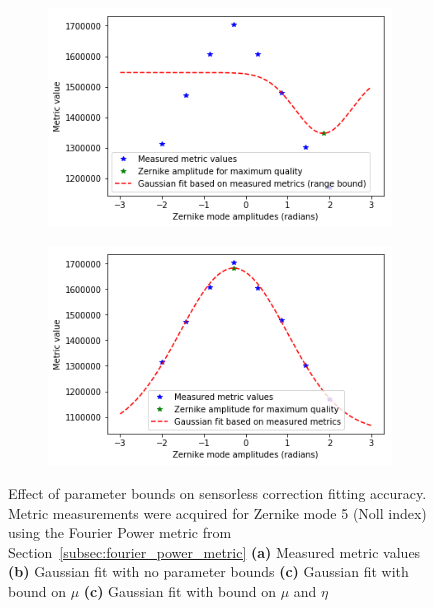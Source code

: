 \begin{figure}[h]
	\begin{subfigure}{0.48\textwidth}
		\centering
		\includegraphics[width=\linewidth]{images/zernike_fitting_current_power_metric_range_bound_2.png}
		\caption{}
		\label{fig:zernike_fitting_current_power_metric_range_bound_2}
	\end{subfigure}
	\begin{subfigure}{0.48\textwidth}
		\centering
		\includegraphics[width=\linewidth]{images/zernike_fitting_current_power_metric_bound_2.png}
		\caption{}
		\label{fig:zernike_fitting_current_power_metric_bound_2}
	\end{subfigure}
	\caption[Effect of parameter bounds on sensorless correction fitting accuracy]{Effect of parameter bounds on sensorless correction fitting accuracy. Metric measurements were acquired for Zernike mode 5 (Noll index) using the Fourier Power metric from Section~\ref{subsec:fourier_power_metric} \textbf{(a)} Measured metric values \textbf{(b)} Gaussian fit with no parameter bounds \textbf{(c)} Gaussian fit with bound on $\mu$ \textbf{(c)} Gaussian fit with bound on $\mu$ and $\eta$}
	\label{fig:sensorless_fitting_accuracy}
\end{figure}

